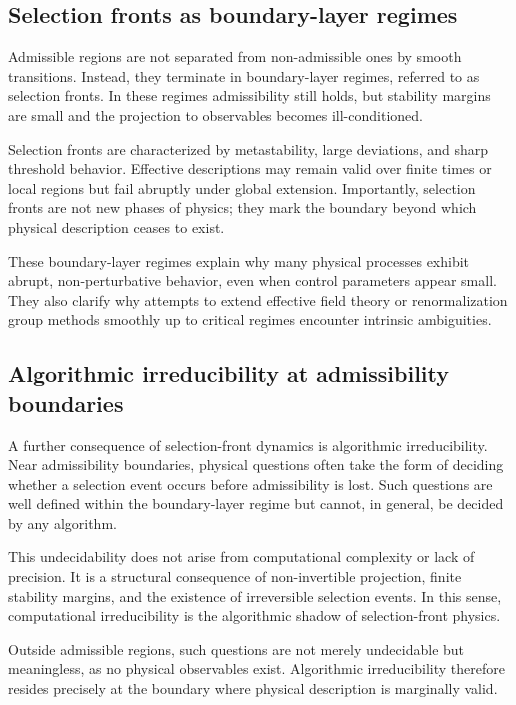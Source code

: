 \documentclass[11pt]{article}
\begin{document}
\subsection{Selection fronts as boundary-layer regimes}

Admissible regions are not separated from non-admissible ones by smooth transitions. Instead, they terminate in boundary-layer regimes, referred to as selection fronts. In these regimes admissibility still holds, but stability margins are small and the projection to observables becomes ill-conditioned.

Selection fronts are characterized by metastability, large deviations, and sharp threshold behavior. Effective descriptions may remain valid over finite times or local regions but fail abruptly under global extension. Importantly, selection fronts are not new phases of physics; they mark the boundary beyond which physical description ceases to exist.

These boundary-layer regimes explain why many physical processes exhibit abrupt, non-perturbative behavior, even when control parameters appear small. They also clarify why attempts to extend effective field theory or renormalization group methods smoothly up to critical regimes encounter intrinsic ambiguities.

\subsection{Algorithmic irreducibility at admissibility boundaries}

A further consequence of selection-front dynamics is algorithmic irreducibility. Near admissibility boundaries, physical questions often take the form of deciding whether a selection event occurs before admissibility is lost. Such questions are well defined within the boundary-layer regime but cannot, in general, be decided by any algorithm.

This undecidability does not arise from computational complexity or lack of precision. It is a structural consequence of non-invertible projection, finite stability margins, and the existence of irreversible selection events. In this sense, computational irreducibility is the algorithmic shadow of selection-front physics.

Outside admissible regions, such questions are not merely undecidable but meaningless, as no physical observables exist. Algorithmic irreducibility therefore resides precisely at the boundary where physical description is marginally valid.
\end{document}
